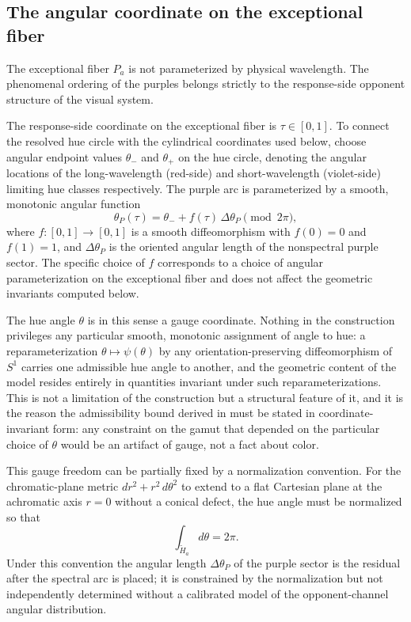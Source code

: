\documentclass[preprint,12pt,authoryear]{elsarticle}
\theoremstyle{plain}
\theoremstyle{definition}
\theoremstyle{remark}
\begin{document}
\subsection{The angular coordinate on the exceptional fiber}
\label{subsec:angular-coordinate-exceptional-fiber}

\noindent The exceptional fiber $P_a$ is not parameterized by physical wavelength. The phenomenal ordering of the purples belongs strictly to the response-side opponent structure of the visual system.

The response-side coordinate on the exceptional fiber is $\tau\in[0,1]$. To connect the resolved hue circle with the cylindrical coordinates used below, choose angular endpoint values $\theta_{-}$ and $\theta_{+}$ on the hue circle, denoting the angular locations of the long-wavelength (red-side) and short-wavelength (violet-side) limiting hue classes respectively. The purple arc is parameterized by a smooth, monotonic angular function
\[
\theta_P(\tau)=\theta_{-}+f(\tau)\,\Delta\theta_P
\pmod{2\pi},
\]
where $f:[0,1]\to[0,1]$ is a smooth diffeomorphism with $f(0)=0$ and $f(1)=1$, and $\Delta\theta_P$ is the oriented angular length of the nonspectral purple sector. The specific choice of $f$ corresponds to a choice of angular parameterization on the exceptional fiber and does not affect the geometric invariants computed below.

The hue angle $\theta$ is in this sense a gauge coordinate. Nothing in the construction privileges any particular smooth, monotonic assignment of angle to hue: a reparameterization $\theta\mapsto\psi(\theta)$ by any orientation-preserving diffeomorphism of $S^1$ carries one admissible hue angle to another, and the geometric content of the model resides entirely in quantities invariant under such reparameterizations. This is not a limitation of the construction but a structural feature of it, and it is the reason the admissibility bound derived in  must be stated in coordinate-invariant form: any constraint on the gamut that depended on the particular choice of $\theta$ would be an artifact of gauge, not a fact about color.

This gauge freedom can be partially fixed by a normalization convention. For the chromatic-plane metric $dr^2+r^2\,d\theta^2$ to extend to a flat Cartesian plane at the achromatic axis $r=0$ without a conical defect, the hue angle must be normalized so that
\[
\int_{\widetilde H_a} d\theta = 2\pi.
\]
Under this convention the angular length $\Delta\theta_P$ of the purple sector is the residual after the spectral arc is placed; it is constrained by the normalization but not independently determined without a calibrated model of the opponent-channel angular distribution.
\end{document}
